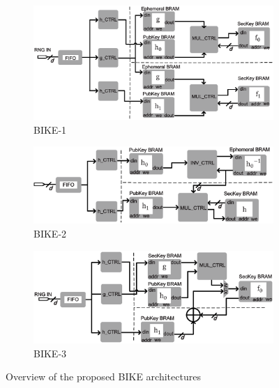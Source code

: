 \documentclass[runningheads]{llncs}
\begin{document}
\begin{figure}[!tb]
\centering
\begin{subfigure}[t]{0.47\textwidth}\centering
\includegraphics[width=\textwidth]{./fig/BIKE-1.eps}
\caption{BIKE-1}
\label{fig:bike1}
\end{subfigure}
\hspace{1em}
\begin{subfigure}[t]{0.47\textwidth}\centering
\includegraphics[width=\textwidth]{./fig/BIKE-2.eps}
\caption{BIKE-2 }
\label{fig:bike2}
\end{subfigure}
\begin{subfigure}[t]{0.47\textwidth}\centering
\includegraphics[width=\textwidth]{./fig/BIKE-3.eps}
\caption{BIKE-3 }
\label{fig:bike3}
\end{subfigure}
\caption{Overview of the proposed BIKE architectures}
\end{figure}
\end{document}
